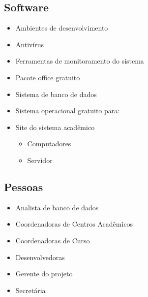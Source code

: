         \subsection{Software}
            \begin{itemize}
                \item Ambientes de desenvolvimento
                \item Antivírus
                \item Ferramentas de monitoramento do sistema
                \item Pacote office gratuito
                \item Sistema de banco de dados
                \item Sistema operacional gratuito para:
                \item Site do sistema acadêmico
                \begin{itemize}
                    \item Computadores
                    \item Servidor
                \end{itemize}
            \end{itemize}
    
        \subsection{Pessoas}
            \begin{itemize}
                \item Analista de banco de dados
                \item Coordenadoras de Centros Acadêmicos
                \item Coordenadoras de Curso
                \item Desenvolvedoras
                \item Gerente do projeto
                \item Secretária
            \end{itemize}
    
